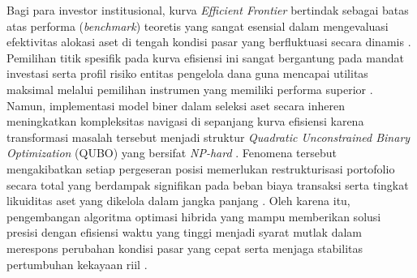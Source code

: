 Bagi para investor institusional, kurva \textit{Efficient Frontier} bertindak sebagai batas atas performa (\textit{benchmark}) teoretis yang sangat esensial dalam mengevaluasi efektivitas alokasi aset di tengah kondisi pasar yang berfluktuasi secara dinamis \cite{markowitz_portfolio_1952}. Pemilihan titik spesifik pada kurva efisiensi ini sangat bergantung pada mandat investasi serta profil risiko entitas pengelola dana guna mencapai utilitas maksimal melalui pemilihan instrumen yang memiliki performa superior \cite{sikalo_efficient_2022}. Namun, implementasi model biner dalam seleksi aset secara inheren meningkatkan kompleksitas navigasi di sepanjang kurva efisiensi karena transformasi masalah tersebut menjadi struktur \textit{Quadratic Unconstrained Binary Optimization} (QUBO) yang bersifat \textit{NP-hard} \cite{wang_achieving_2025}. Fenomena tersebut mengakibatkan setiap pergeseran posisi memerlukan restrukturisasi portofolio secara total yang berdampak signifikan pada beban biaya transaksi serta tingkat likuiditas aset yang dikelola dalam jangka panjang \cite{padilla_quantum_2025}. Oleh karena itu, pengembangan algoritma optimasi hibrida yang mampu memberikan solusi presisi dengan efisiensi waktu yang tinggi menjadi syarat mutlak dalam merespons perubahan kondisi pasar yang cepat serta menjaga stabilitas pertumbuhan kekayaan riil \cite{wei_solving_2025}.